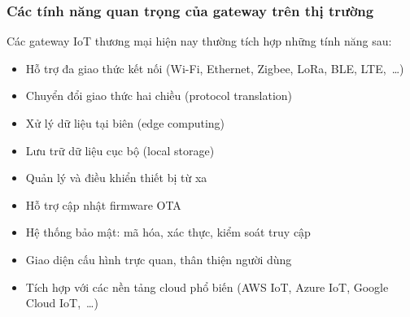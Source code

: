         \subsubsection{Các tính năng quan trọng của gateway trên thị trường}
            Các gateway IoT thương mại hiện nay thường tích hợp những tính năng sau:
            \begin{itemize}
                \item Hỗ trợ đa giao thức kết nối (Wi-Fi, Ethernet, Zigbee, LoRa, BLE, LTE,~\ldots)
                \item Chuyển đổi giao thức hai chiều (protocol translation)
                \item Xử lý dữ liệu tại biên (edge computing)
                \item Lưu trữ dữ liệu cục bộ (local storage)
                \item Quản lý và điều khiển thiết bị từ xa
                \item Hỗ trợ cập nhật firmware OTA
                \item Hệ thống bảo mật: mã hóa, xác thực, kiểm soát truy cập
                \item Giao diện cấu hình trực quan, thân thiện người dùng
                \item Tích hợp với các nền tảng cloud phổ biến (AWS IoT, Azure IoT, Google Cloud IoT,~\ldots)
            \end{itemize}
